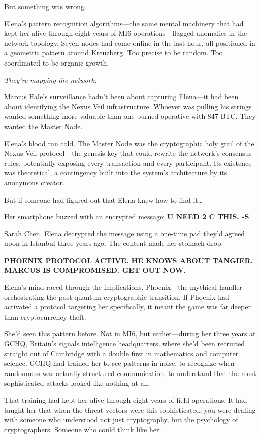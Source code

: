 But something was wrong.

Elena's pattern recognition algorithms---the same mental machinery that had kept her alive through eight years of MI6 operations---flagged anomalies in the network topology. Seven nodes had come online in the last hour, all positioned in a geometric pattern around Kreuzberg. Too precise to be random. Too coordinated to be organic growth.

\emph{They're mapping the network.}

Marcus Hale's surveillance hadn't been about capturing Elena---it had been about identifying the Nexus Veil infrastructure. Whoever was pulling his strings wanted something more valuable than one burned operative with 847 BTC. They wanted the Master Node.

Elena's blood ran cold. The Master Node was the cryptographic holy grail of the Nexus Veil protocol---the genesis key that could rewrite the network's consensus rules, potentially exposing every transaction and every participant. Its existence was theoretical, a contingency built into the system's architecture by its anonymous creator.

But if someone had figured out that Elena knew how to find it\ldots{}

Her smartphone buzzed with an encrypted message: \textbf{U NEED 2 C THIS. -S}

Sarah Chen. Elena decrypted the message using a one-time pad they'd agreed upon in Istanbul three years ago. The content made her stomach drop.

\textbf{PHOENIX PROTOCOL ACTIVE. HE KNOWS ABOUT TANGIER. MARCUS IS COMPROMISED. GET OUT NOW.}

Elena's mind raced through the implications. Phoenix---the mythical handler orchestrating the post-quantum cryptographic transition. If Phoenix had activated a protocol targeting her specifically, it meant the game was far deeper than cryptocurrency theft.

She'd seen this pattern before. Not in MI6, but earlier---during her three years at GCHQ, Britain's signals intelligence headquarters, where she'd been recruited straight out of Cambridge with a double first in mathematics and computer science. GCHQ had trained her to see patterns in noise, to recognize when randomness was actually structured communication, to understand that the most sophisticated attacks looked like nothing at all.

That training had kept her alive through eight years of field operations. It had taught her that when the threat vectors were this sophisticated, you were dealing with someone who understood not just cryptography, but the psychology of cryptographers. Someone who could think like her.

